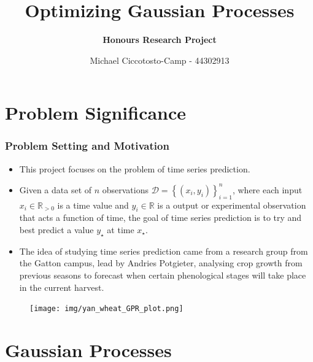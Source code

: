 \documentclass[9pt,hyperref={pdfpagelabels=false},xcolor=table]{beamer}
\title{Optimizing Gaussian Processes}
\author[Michael Ciccotosto-Camp]{{\bf Honours Research Project}}
\date{
Michael Ciccotosto-Camp - 44302913 \\
}
\begin{document}
\maketitle

\section{Problem Significance}

\begin{frame}
    \frametitle{Problem Setting and Motivation}
    \begin{itemize}
        \item This project focuses on the problem of time series prediction.
        \item Given a data set of $n$ observations $\mathcal{D} = \left\{ \left( x_i , y_i \right) \right\}_{i=1}^{n}$, where each input $x_i \in \mathbb{R}_{>0}$ is a time value and $y_i \in \mathbb{R}$ is a output or experimental observation that acts a function of time, the goal of time series prediction is to try and best predict a value $y_{\star}$ at time $x_{\star}$.
        \item The idea of studying time series prediction came from a research group from the Gatton campus, lead by Andries Potgieter, analysing crop growth from previous seasons to forecast when certain phenological stages will take place in the current harvest.
    \end{itemize}
    \begin{figure}
        \centering
        \texttt{[image: img/yan\_wheat\_GPR\_plot.png]}
    \end{figure}
\end{frame}

\section{Gaussian Processes}
\end{document}
